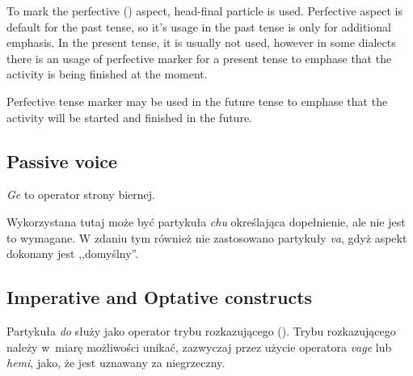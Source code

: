 

To mark the perfective (\Pfv{}) aspect, head-final  particle is used.
Perfective aspect is default for the past tense, so it's usage in the past tense
is only for additional emphasis. In the present tense, it is usually not used,
however in some dialects there is an usage of perfective marker for a present
tense to emphase that the activity is being finished at the moment.

Perfective tense marker may be used in the future tense to emphase that the
activity will be started and finished in the future.





\subsection{Passive voice}

\emph{Ge} to operator strony biernej.


Wykorzystana tutaj może być partykuła \emph{chu} określająca dopełnienie, ale
nie jest to wymagane. W zdaniu tym również nie zastosowano partykuły \emph{va},
gdyż aspekt dokonany jest ,,domyślny''.

\subsection{Imperative and Optative constructs}

Partykuła \emph{do} służy jako operator trybu rozkazującego (\Imp{}). Trybu
rozkazującego należy w~miarę możliwości unikać, zazwyczaj przez użycie operatora
\emph{vage} lub \emph{hemi}, jako, że jest uznawany za niegrzeczny.

